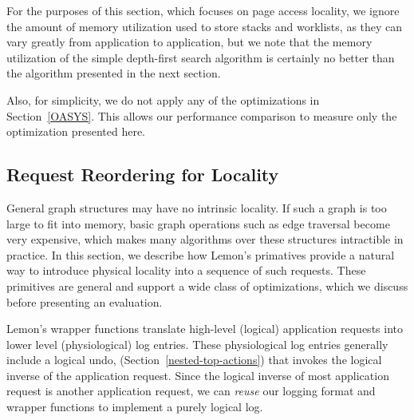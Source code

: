 \documentclass[letterpaper,twocolumn,english]{article}
\newcommand{\yad}{Lemon\xspace}
\begin{document}
For the purposes of this section, which focuses on page access
locality, we ignore the amount of memory utilization used to store
stacks and worklists, as they can vary greatly from application to
application, but we note that the memory utilization of the simple
depth-first search algorithm is certainly no better than the algorithm
presented in the next section.

Also, for simplicity, we do not apply any of the optimizations in
Section~\ref{OASYS}.  This allows our performance comparison to
 measure only the optimization presented here.

\subsection {Request Reordering for Locality}

General graph structures may have no intrinsic locality.  If such a
graph is too large to fit into memory, basic graph operations such as
edge traversal become very expensive, which makes many algorithms over
these structures intractible in practice.  In this section, we
describe how \yad's primatives provide a natural way to introduce
physical locality into a sequence of such requests.  These primitives
are general and support a wide class of optimizations, which we discuss
before presenting an evaluation.

\yad's wrapper functions translate high-level (logical) application
requests into lower level (physiological) log entries.  These
physiological log entries generally include a logical undo,
(Section~\ref{nested-top-actions}) that invokes the logical
inverse of the application request.  Since the logical inverse of most
application request is another application request, we can {\em reuse} our
logging format and wrapper functions to implement a purely logical log.
\end{document}
